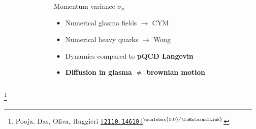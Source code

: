 \documentclass[aspectratio=169,11pt,usenames,dvipsnames]{beamer}
\renewcommand{\thefootnote}{\color{customblue}\faPaperPlaneO}
\newcommand\blfootnote[1]{%
  \begingroup
  \renewcommand\thefootnote{}\footnote{#1}%
  \addtocounter{footnote}{-1}%
  \endgroup
}
\begin{document}
\begin{frame}[t,noframenumbering]
\begin{columns}[onlytextwidth,t]
\begin{figure}
        \end{figure}
        \begin{center}
            {\Large\color{isgold} Momentum variance $\sigma_p$ \\[10pt]}
            \footnotesize
                \begin{itemize}
                    \item {\color{lightgray}Numerical glasma fields $\rightarrow$ CYM}
                    \item {\color{lightgray}Numerical heavy quarks $\rightarrow$ Wong}
                    \item {\color{lightgray}Dynamics compared to {\bfseries pQCD Langevin}}\\[15pt]
                    \item {\color{destacado}\bfseries\normalsize{Diffusion in glasma $\neq$ {\bfseries brownian motion}}}
                \end{itemize}
        \end{center}
    \end{columns}
    \blfootnote{\scriptsize Pooja, Das, Oliva, Ruggieri \href{https://arxiv.org/abs/2110.14610}{\color{palgold}\texttt{[2110.14610]}$^\text{\scalebox{0.9}{\faExternalLink}}$}}
\end{frame}
\end{document}
